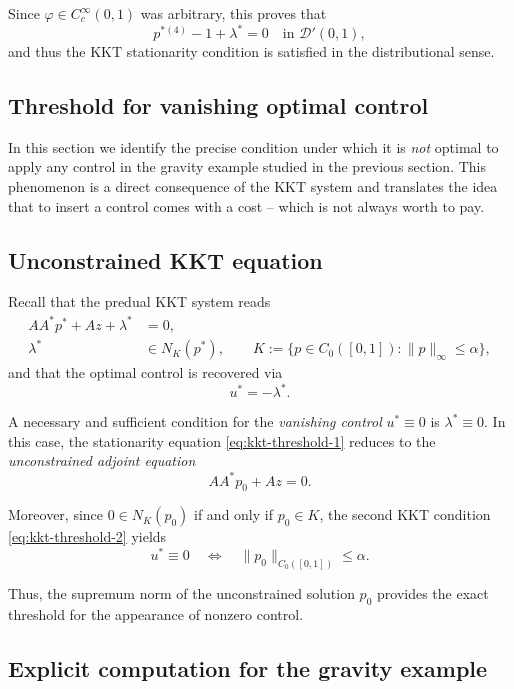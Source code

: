 \documentclass[11pt,a4paper]{article}
\begin{document}
Since $\varphi\in C_c^\infty(0,1)$ was arbitrary, this proves that
\[
p^{*(4)} - 1 + \lambda^* = 0
\quad \text{in } \mathcal D'(0,1),
\]
and thus the KKT stationarity condition is satisfied in the distributional
sense.

\subsection{Threshold for vanishing optimal control}

In this section we identify the precise condition under which it is \emph{not}
optimal to apply any control in the gravity example studied in the previous
section. This phenomenon is a direct consequence of the KKT system and translates the idea that to insert a control comes with a cost -- which is not always worth to pay.

\subsection*{Unconstrained KKT equation}

Recall that the predual KKT system reads
\begin{align}
AA^* p^* + A z + \lambda^* &= 0, \label{eq:kkt-threshold-1}\\
\lambda^* &\in N_K(p^*),
\qquad K := \{p\in C_0([0,1]) : \|p\|_\infty \le \alpha\}, \label{eq:kkt-threshold-2}
\end{align}
and that the optimal control is recovered via
\[
u^* = -\lambda^*.
\]

A necessary and sufficient condition for the \emph{vanishing control}
$u^*\equiv 0$ is $\lambda^*\equiv 0$.
In this case, the stationarity equation \eqref{eq:kkt-threshold-1} reduces to the
\emph{unconstrained adjoint equation}
\begin{equation}
AA^* p_0 + A z = 0.
\label{eq:unconstrained-adjoint}
\end{equation}

Moreover, since $0\in N_K(p_0)$ if and only if $p_0\in K$, the second KKT condition
\eqref{eq:kkt-threshold-2} yields
\begin{equation}
u^*\equiv 0
\quad \Longleftrightarrow \quad
\|p_0\|_{C_0([0,1])} \le \alpha.
\label{eq:threshold-condition}
\end{equation}

Thus, the supremum norm of the unconstrained solution $p_0$ provides the exact
threshold for the appearance of nonzero control.

\subsection*{Explicit computation for the gravity example}
\end{document}
